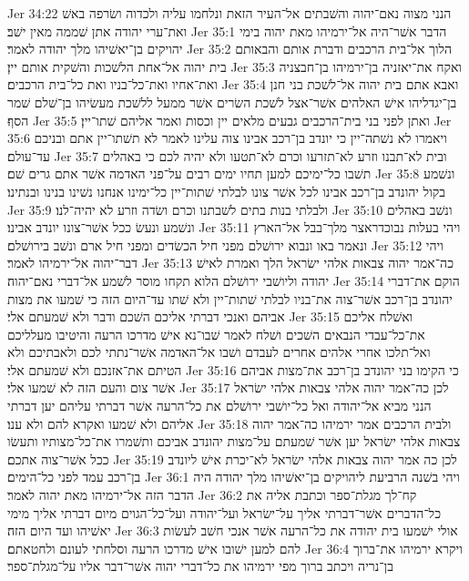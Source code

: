 Jer 34:22  הנני מצוה נאם־יהוה והשׁבתים אל־העיר הזאת ונלחמו עליה ולכדוה ושׂרפה באשׁ ואת־ערי יהודה אתן שׁממה מאין ישׁב׃
Jer 35:1  הדבר אשׁר־היה אל־ירמיהו מאת יהוה בימי יהויקים בן־יאשׁיהו מלך יהודה לאמר׃
Jer 35:2  הלוך אל־בית הרכבים ודברת אותם והבאותם בית יהוה אל־אחת הלשׁכות והשׁקית אותם יין׃
Jer 35:3  ואקח את־יאזניה בן־ירמיהו בן־חבצניה ואת־אחיו ואת־כל־בניו ואת כל־בית הרכבים׃
Jer 35:4  ואבא אתם בית יהוה אל־לשׁכת בני חנן בן־יגדליהו אישׁ האלהים אשׁר־אצל לשׁכת השׂרים אשׁר ממעל ללשׁכת מעשׂיהו בן־שׁלם שׁמר הסף׃
Jer 35:5  ואתן לפני בני בית־הרכבים גבעים מלאים יין וכסות ואמר אליהם שׁתו־יין׃
Jer 35:6  ויאמרו לא נשׁתה־יין כי יונדב בן־רכב אבינו צוה עלינו לאמר לא תשׁתו־יין אתם ובניכם עד־עולם׃
Jer 35:7  ובית לא־תבנו וזרע לא־תזרעו וכרם לא־תטעו ולא יהיה לכם כי באהלים תשׁבו כל־ימיכם למען תחיו ימים רבים על־פני האדמה אשׁר אתם גרים שׁם׃
Jer 35:8  ונשׁמע בקול יהונדב בן־רכב אבינו לכל אשׁר צונו לבלתי שׁתות־יין כל־ימינו אנחנו נשׁינו בנינו ובנתינו׃
Jer 35:9  ולבלתי בנות בתים לשׁבתנו וכרם ושׂדה וזרע לא יהיה־לנו׃
Jer 35:10  ונשׁב באהלים ונשׁמע ונעשׂ ככל אשׁר־צונו יונדב אבינו׃
Jer 35:11  ויהי בעלות נבוכדראצר מלך־בבל אל־הארץ ונאמר באו ונבוא ירושׁלם מפני חיל הכשׂדים ומפני חיל ארם ונשׁב בירושׁלם׃
Jer 35:12  ויהי דבר־יהוה אל־ירמיהו לאמר׃
Jer 35:13  כה־אמר יהוה צבאות אלהי ישׂראל הלך ואמרת לאישׁ יהודה וליושׁבי ירושׁלם הלוא תקחו מוסר לשׁמע אל־דברי נאם־יהוה׃
Jer 35:14  הוקם את־דברי יהונדב בן־רכב אשׁר־צוה את־בניו לבלתי שׁתות־יין ולא שׁתו עד־היום הזה כי שׁמעו את מצות אביהם ואנכי דברתי אליכם השׁכם ודבר ולא שׁמעתם אלי׃
Jer 35:15  ואשׁלח אליכם את־כל־עבדי הנבאים השׁכים ושׁלח לאמר שׁבו־נא אישׁ מדרכו הרעה והיטיבו מעלליכם ואל־תלכו אחרי אלהים אחרים לעבדם ושׁבו אל־האדמה אשׁר־נתתי לכם ולאבתיכם ולא הטיתם את־אזנכם ולא שׁמעתם אלי׃
Jer 35:16  כי הקימו בני יהונדב בן־רכב את־מצות אביהם אשׁר צום והעם הזה לא שׁמעו אלי׃
Jer 35:17  לכן כה־אמר יהוה אלהי צבאות אלהי ישׂראל הנני מביא אל־יהודה ואל כל־יושׁבי ירושׁלם את כל־הרעה אשׁר דברתי עליהם יען דברתי אליהם ולא שׁמעו ואקרא להם ולא ענו׃
Jer 35:18  ולבית הרכבים אמר ירמיהו כה־אמר יהוה צבאות אלהי ישׂראל יען אשׁר שׁמעתם על־מצות יהונדב אביכם ותשׁמרו את־כל־מצותיו ותעשׂו ככל אשׁר־צוה אתכם׃
Jer 35:19  לכן כה אמר יהוה צבאות אלהי ישׂראל לא־יכרת אישׁ ליונדב בן־רכב עמד לפני כל־הימים׃
Jer 36:1  ויהי בשׁנה הרביעת ליהויקים בן־יאשׁיהו מלך יהודה היה הדבר הזה אל־ירמיהו מאת יהוה לאמר׃
Jer 36:2  קח־לך מגלת־ספר וכתבת אליה את כל־הדברים אשׁר־דברתי אליך על־ישׂראל ועל־יהודה ועל־כל־הגוים מיום דברתי אליך מימי יאשׁיהו ועד היום הזה׃
Jer 36:3  אולי ישׁמעו בית יהודה את כל־הרעה אשׁר אנכי חשׁב לעשׂות להם למען ישׁובו אישׁ מדרכו הרעה וסלחתי לעונם ולחטאתם׃
Jer 36:4  ויקרא ירמיהו את־ברוך בן־נריה ויכתב ברוך מפי ירמיהו את כל־דברי יהוה אשׁר־דבר אליו על־מגלת־ספר׃
